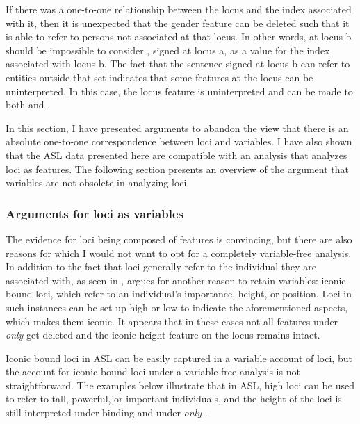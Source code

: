 \documentclass[output=paper,
modfonts
]{langscibook}
\begin{document}
If there was a one-to-one relationship between the locus and the index associated with it, then it is unexpected that the gender feature can be deleted such that it is able to refer to persons not associated at that locus. In other words,  at locus b should be impossible to consider , signed at locus a, as a value for the index associated with locus b. The fact that the sentence signed at locus b can refer to entities outside that set indicates that some features at the locus can be uninterpreted. In this case, the locus feature is uninterpreted and  can be made to both  and . 

In this section, I have presented arguments to abandon the view that there is an absolute one-to-one correspondence between loci and variables. I have also shown that the ASL data presented here are compatible with an analysis that analyzes loci as features. The following section presents an overview of the argument that variables are not obsolete in analyzing loci. 

\subsubsection{Arguments for loci as variables}

The evidence for loci being composed of features is convincing, but there are also reasons for which I would not want to opt for a completely variable-free analysis. In addition to the fact that loci generally refer to the individual they are associated with, as seen in , \citet{Schlenker2014} argues for another reason to retain variables: iconic bound loci, which refer to an individual's importance, height, or position. Loci in such instances can be set up high or low to indicate the aforementioned aspects, which makes them iconic. It appears that in these cases not all features under \textit{only} get deleted and the iconic height feature on the locus remains intact. 

Iconic bound loci in ASL can be easily captured in a variable account of loci, but the account for iconic bound loci under a variable-free analysis is not straightforward. The examples below illustrate that in ASL, high loci can be used to refer to tall, powerful, or important individuals, and the height of the loci is still interpreted under binding and under \textit{only} \citep{Schlenker2014}.
\end{document}
